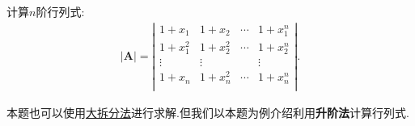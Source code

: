 \documentclass[lang=cn,newtx,10pt,scheme=chinese]{elegantbook}
\begin{document}
\begin{exercise}\label{升阶法的应用(1)例题}
计算$n$阶行列式:
\begin{align*}
    |\boldsymbol{A}|=\left| \begin{matrix}
        1+x_1&		1+x_2&		\cdots&		1+x_{1}^{n}\\1+x_{1}^{2}
        &		1+x_{2}^{2}&		\cdots&		1+x_{2}^{n}\\
        \vdots&		\vdots&		&		\vdots\\
        1+x_n&		1+x_{n}^{2}&		\cdots&		1+x_{n}^{n}\\
    \end{matrix} \right|.
\end{align*}
\end{exercise}
\begin{note}
    本题也可以使用\hyperref[大拆分法]{大拆分法}进行求解.但我们以本题为例介绍利用\textbf{升阶法}计算行列式.
\end{note}
\end{document}
